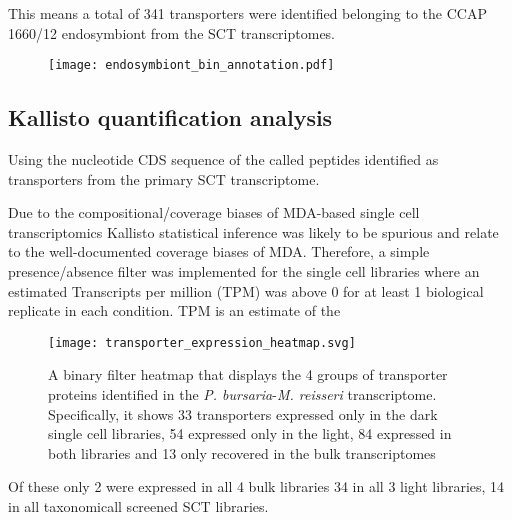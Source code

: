 This means a total of 341 transporters were identified 
belonging to the CCAP 1660/12 endosymbiont from the SCT transcriptomes. 


\begin{figure}
    \texttt{[image: endosymbiont\_bin\_annotation.pdf]}
    \caption{}
    \label{BLAST hits at a more stringent threshold than 
    that used in the binning thus the lack of 100 annotation.}
\end{figure}

\subsection{Kallisto quantification analysis}

Using the nucleotide CDS sequence of the called peptides identified as transporters
from the primary SCT transcriptome. 

Due to the compositional/coverage biases of MDA-based single cell transcriptomics 
Kallisto statistical inference was likely to be spurious and relate to the 
well-documented coverage biases of MDA. Therefore, a simple presence/absence
filter was implemented for the single cell libraries where an estimated
Transcripts per million (TPM) was above 0 for at least 1 biological replicate
in each condition. 
TPM is an estimate of the 


\begin{figure}
    \texttt{[image: transporter\_expression\_heatmap.svg]}
    \caption{A binary filter heatmap that displays the 4 groups of transporter
        proteins identified in the \textit{P. bursaria}-\textit{M. reisseri} 
        transcriptome.  Specifically, it shows 33 transporters expressed only
        in the dark single cell libraries, 54 expressed only in the light,
    84 expressed in both libraries and 13 only recovered in the bulk transcriptomes}
    \label{fig:binary_expression_heatmap}
\end{figure}


Of these only 2 were expressed in all 4 bulk libraries 34 in all 3 light libraries, 14 in all taxonomicall screened SCT libraries.

